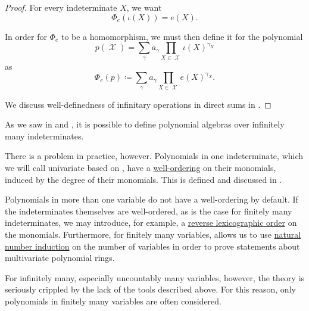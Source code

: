\begin{proof}
  For every indeterminate \( X \), we want
  \begin{equation*}
    \Phi_e(\iota(X)) = e(X).
  \end{equation*}

  In order for \( \Phi_e \) to be a homomorphism, we must then define it for the polynomial
  \begin{equation*}
    p(\mscrX) = \sum_\gamma a_\gamma \prod_{X \in \mscrX} \iota(X)^{\gamma_X}
  \end{equation*}
  as
  \begin{equation*}
    \Phi_e(p) \coloneqq \sum_\gamma a_\gamma \prod_{X \in \mscrX} e(X)^{\gamma_X}.
  \end{equation*}

  We discuss well-definedness of infinitary operations in direct sums in .
\end{proof}

\begin{remark}\label{rem:polynomials_over_infinitely_many_indeterminates}
  As we saw in  and , it is possible to define polynomial algebras over infinitely many indeterminates.

  There is a problem in practice, however. Polynomials in one indeterminate, which we will call univariate based on , have a \hyperref[def:well_ordered_set]{well-ordering} on their monomials, induced by the degree of their monomials. This is defined and discussed in .

  Polynomials in more than one variable do not have a well-ordering by default. If the indeterminates themselves are well-ordered, as is the case for finitely many indeterminates, we may introduce, for example, a \hyperref[def:lexicographic_order]{reverse lexicographic order} on the monomials. Furthermore, for finitely many variables,  allows us to use \hyperref[rem:induction/peano_arithmetic]{natural number induction} on the number of variables in order to prove statements about multivariate polynomial rings.

  For infinitely many, especially uncountably many variables, however, the theory is seriously crippled by the lack of the tools described above. For this reason, only polynomials in finitely many variables are often considered.
\end{remark}

